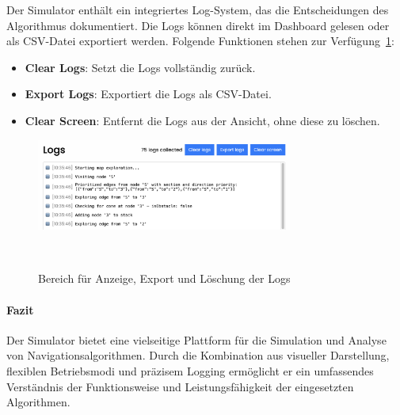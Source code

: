 \documentclass[main.tex]{subfiles} %
\begin{document}
Der Simulator enthält ein integriertes Log-System, das die Entscheidungen des Algorithmus dokumentiert. Die Logs können direkt im Dashboard gelesen oder als CSV-Datei exportiert werden. Folgende Funktionen stehen zur Verfügung~\ref{fig:DashboardLogs}:

\begin{itemize}
    \item \textbf{Clear Logs}:  
    Setzt die Logs vollständig zurück.

    \item \textbf{Export Logs}:  
    Exportiert die Logs als CSV-Datei.

    \item \textbf{Clear Screen}:  
    Entfernt die Logs aus der Ansicht, ohne diese zu löschen.
\end{itemize}

\begin{figure}[H]
    \centering
    \includegraphics[width=0.75\textwidth]{./fig_Simulation/SimulatorLogs.png}
    \caption{Bereich für Anzeige, Export und Löschung der Logs}~\label{fig:DashboardLogs}
\end{figure}

\paragraph{Fazit}

Der Simulator bietet eine vielseitige Plattform für die Simulation und Analyse von Navigationsalgorithmen. Durch die Kombination aus visueller Darstellung, flexiblen Betriebsmodi und präzisem Logging ermöglicht er ein umfassendes Verständnis der Funktionsweise und Leistungsfähigkeit der eingesetzten Algorithmen.
\end{document}
